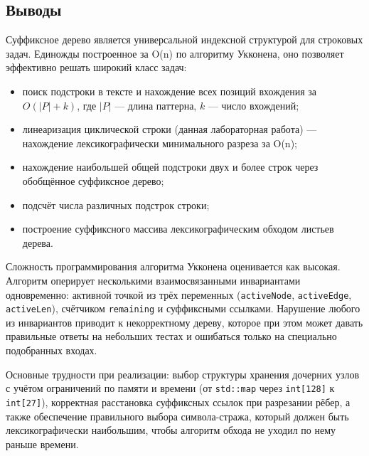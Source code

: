 \documentclass[12pt]{article}
\begin{document}
\subsection*{Выводы}

Суффиксное дерево является универсальной индексной структурой для
строковых задач. Единожды построенное за O(n) по алгоритму Укконена,
оно позволяет эффективно решать широкий класс задач:

\begin{itemize}
	\item поиск подстроки в тексте и нахождение всех позиций
	вхождения за $O(|P| + k)$, где $|P|$ --- длина паттерна,
	$k$ --- число вхождений;
	\item линеаризация циклической строки (данная лабораторная работа)
	--- нахождение лексикографически минимального разреза за O(n);
	\item нахождение наибольшей общей подстроки двух и более строк
	через обобщённое суффиксное дерево;
	\item подсчёт числа различных подстрок строки;
	\item построение суффиксного массива лексикографическим обходом
	листьев дерева.
\end{itemize}

Сложность программирования алгоритма Укконена оценивается как высокая.
Алгоритм оперирует несколькими взаимосвязанными инвариантами
одновременно: активной точкой из трёх переменных
(\texttt{activeNode}, \texttt{activeEdge}, \texttt{activeLen}),
счётчиком \texttt{remaining} и суффиксными ссылками.
Нарушение любого из инвариантов приводит к некорректному дереву,
которое при этом может давать правильные ответы на небольших тестах
и ошибаться только на специально подобранных входах.

Основные трудности при реализации:
выбор структуры хранения дочерних узлов с учётом ограничений
по памяти и времени (от \texttt{std::map} через \texttt{int[128]}
к \texttt{int[27]}), корректная расстановка суффиксных ссылок
при разрезании рёбер, а также обеспечение правильного выбора
символа-стража, который должен быть лексикографически наибольшим,
чтобы алгоритм обхода не уходил по нему раньше времени.
\end{document}
